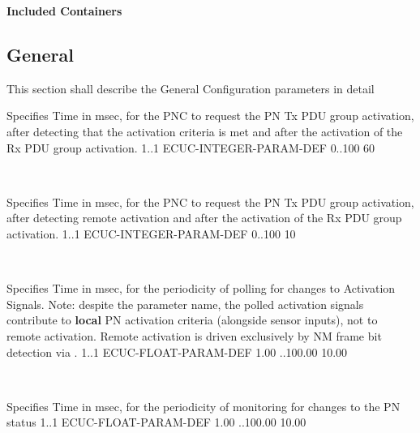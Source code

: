 
\noindent
\textbf{Included Containers}



\subsection{General}
\label{subsection:general}
This section shall describe the General Configuration parameters in detail






%
{Specifies Time in msec, for the PNC to request the PN Tx PDU group activation, after detecting that the activation criteria is met and after the activation of the Rx PDU group activation.}
{1..1}
{ECUC-INTEGER-PARAM-DEF}
{0..100}
{60}

\\
{ }


{Specifies Time in msec, for the PNC to request the PN Tx PDU group activation, after detecting remote activation and after the activation of the Rx PDU group activation.}
{1..1}
{ECUC-INTEGER-PARAM-DEF}
{0..100}
{10}

\\
{}


{Specifies Time in msec, for the periodicity of polling for changes to Activation Signals. Note: despite the parameter name, the polled activation signals contribute to \textbf{local} PN activation criteria (alongside sensor inputs), not to remote activation. Remote activation is driven exclusively by NM frame bit detection via .}
{1..1}
{ECUC-FLOAT-PARAM-DEF}
{1.00 ..100.00}
{10.00}

\\
{}


{Specifies Time in msec, for the periodicity of monitoring for changes to the PN status}
{1..1}
{ECUC-FLOAT-PARAM-DEF}
{1.00 ..100.00}
{10.00}


